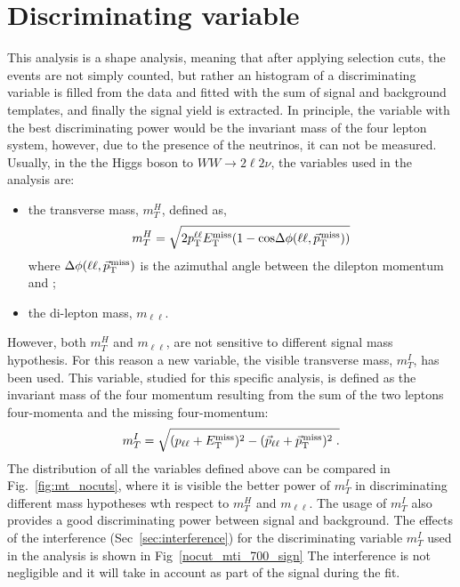 \section{Discriminating variable}
This analysis is a shape analysis, meaning that after applying selection cuts, the events are not simply counted, but rather an histogram of a discriminating variable is filled from the data and fitted with the sum of signal and background templates, and finally the signal yield is extracted.
In principle, the variable with the best discriminating power would be the invariant mass of
the four lepton system, however, due to the presence of the neutrinos, it can not be measured.
Usually, in the the Higgs boson to $WW \to 2\ell 2\nu $, the variables used in the analysis are:
\begin{itemize}
\item the transverse mass, $m_T^H$, defined as,  
\begin{equation}
 m_T^H = \sqrt{2p_{\rm T}^{\ell\ell}E_{\mathrm{T}}^{\text{miss}}(1-\mathrm{cos}\Delta\phi(\ell\ell, {\vec p}_{\mathrm{T}}^{\kern1pt\text{miss}}))}
\end{equation}
where $\Delta\phi(\ell\ell, {\vec p}_{\mathrm{T}}^{\kern1pt\text{miss}})$ is the azimuthal angle between the dilepton momentum and \ptvecmiss;
\item the di-lepton mass, $m_{\ell \ell}$.
\end{itemize}
However, both $m_T^H$ and $m_{\ell \ell}$, are not sensitive to different
signal mass hypothesis. For this reason a new variable, the visible transverse mass,  $m_T^I$, has been used.
This variable, studied for this specific analysis, is defined as the invariant mass of the four momentum resulting from the sum of the
two leptons four-momenta and the missing four-momentum: 
\begin{equation}
 m_T^I = \sqrt{ (p_\mathrm{\ell\ell} + E_{\mathrm{T}}^{\text{miss}})^2 - (\vec{p}_\mathrm{\ell\ell} + {\vec p}_{\mathrm{T}}^{\kern1pt\text{miss}})^2 \; .}
\end{equation}
The distribution of all the variables defined above can be compared in 
Fig.~\ref{fig:mt_nocuts}, where it is visible the better power of $m_T^I$ in discriminating different mass hypotheses wth respect to  $m_T^H$ and $m_{\ell \ell}$. The usage of  $m_T^I$ also provides a good discriminating power between signal and background.
The effects of the interference (Sec~\ref{sec:interference}) for the discriminating variable  $m_T^I$  used in the analysis is shown in Fig~\ref{nocut_mti_700_sign}
The interference is not negligible and it will take in account as part of the signal during the fit.
